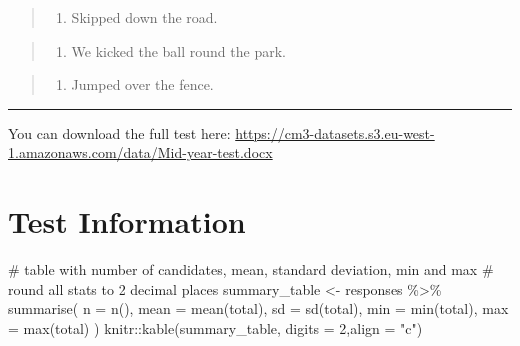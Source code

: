 \documentclass[
  letterpaper,
  DIV=11,
  numbers=noendperiod]{scrreprt}
\newenvironment{Shaded}{\begin{snugshade}}{\end{snugshade}}
\newcommand{\AttributeTok}[1]{\textcolor[rgb]{0.40,0.45,0.13}{#1}}
\newcommand{\CommentTok}[1]{\textcolor[rgb]{0.37,0.37,0.37}{#1}}
\newcommand{\DecValTok}[1]{\textcolor[rgb]{0.68,0.00,0.00}{#1}}
\newcommand{\FunctionTok}[1]{\textcolor[rgb]{0.28,0.35,0.67}{#1}}
\newcommand{\NormalTok}[1]{\textcolor[rgb]{0.00,0.23,0.31}{#1}}
\newcommand{\OtherTok}[1]{\textcolor[rgb]{0.00,0.23,0.31}{#1}}
\newcommand{\SpecialCharTok}[1]{\textcolor[rgb]{0.37,0.37,0.37}{#1}}
\newcommand{\StringTok}[1]{\textcolor[rgb]{0.13,0.47,0.30}{#1}}
\providecommand{\tightlist}{%
  \setlength{\itemsep}{0pt}\setlength{\parskip}{0pt}}\usepackage{longtable,booktabs,array}
\begin{document}
\begin{quote}
\begin{enumerate}
\def\labelenumi{\Alph{enumi})}
\setcounter{enumi}{2}
\tightlist
\item
  Skipped down the road.
\end{enumerate}
\end{quote}

\begin{quote}
\begin{enumerate}
\def\labelenumi{\Alph{enumi})}
\setcounter{enumi}{3}
\tightlist
\item
  We kicked the ball round the park.
\end{enumerate}
\end{quote}

\begin{quote}
\begin{enumerate}
\def\labelenumi{\Alph{enumi})}
\setcounter{enumi}{4}
\tightlist
\item
  Jumped over the fence.
\end{enumerate}
\end{quote}

\begin{center}\rule{0.5\linewidth}{0.5pt}\end{center}

You can download the full test here:
\url{https://cm3-datasets.s3.eu-west-1.amazonaws.com/data/Mid-year-test.docx}

\hypertarget{test-information}{%
\chapter{Test Information}\label{test-information}}

\begin{Shaded}
\begin{Highlighting}[]
\CommentTok{\# table with number of candidates, mean, standard deviation, min and max}
\CommentTok{\# round all stats to 2 decimal places}
\NormalTok{summary\_table }\OtherTok{\textless{}{-}}\NormalTok{ responses }\SpecialCharTok{\%\textgreater{}\%} 
  \FunctionTok{summarise}\NormalTok{(}
    \AttributeTok{n =} \FunctionTok{n}\NormalTok{(),}
    \AttributeTok{mean =} \FunctionTok{mean}\NormalTok{(total),}
    \AttributeTok{sd =} \FunctionTok{sd}\NormalTok{(total),}
    \AttributeTok{min =} \FunctionTok{min}\NormalTok{(total),}
    \AttributeTok{max =} \FunctionTok{max}\NormalTok{(total)}
\NormalTok{  )}
\NormalTok{knitr}\SpecialCharTok{::}\FunctionTok{kable}\NormalTok{(summary\_table, }\AttributeTok{digits =} \DecValTok{2}\NormalTok{,}\AttributeTok{align =} \StringTok{"c"}\NormalTok{)}
\end{Highlighting}
\end{Shaded}
\end{document}
